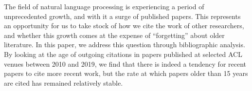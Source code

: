 The field of natural language processing is experiencing a period of unprecedented growth, and with it a surge of published papers. This represents an opportunity for us to take stock of how we cite the work of other researchers, and whether this growth comes at the expense of ``forgetting'' about older literature. In this paper, we address this question through bibliographic analysis. By looking at the age of outgoing citations in papers published at selected ACL venues between 2010 and 2019, we find that there is indeed a tendency for recent papers to cite more recent work, but the rate at which papers older than 15 years are cited has remained relatively stable.
